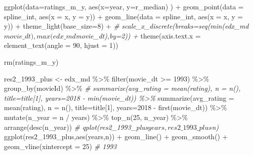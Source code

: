 \documentclass[
]{article}
\newenvironment{Shaded}{}{}
\newcommand{\AttributeTok}[1]{\textcolor[rgb]{0.49,0.56,0.16}{#1}}
\newcommand{\CommentTok}[1]{\textcolor[rgb]{0.38,0.63,0.69}{\textit{#1}}}
\newcommand{\DecValTok}[1]{\textcolor[rgb]{0.25,0.63,0.44}{#1}}
\newcommand{\FunctionTok}[1]{\textcolor[rgb]{0.02,0.16,0.49}{#1}}
\newcommand{\NormalTok}[1]{#1}
\newcommand{\OtherTok}[1]{\textcolor[rgb]{0.00,0.44,0.13}{#1}}
\newcommand{\SpecialCharTok}[1]{\textcolor[rgb]{0.25,0.44,0.63}{#1}}
\begin{document}
\begin{Shaded}
\begin{Highlighting}[]
\FunctionTok{ggplot}\NormalTok{(}\AttributeTok{data=}\NormalTok{ratings\_m\_y, }\FunctionTok{aes}\NormalTok{(}\AttributeTok{x=}\NormalTok{year, }\AttributeTok{y=}\NormalTok{r\_median) ) }\SpecialCharTok{+}
  \FunctionTok{geom\_point}\NormalTok{(}\AttributeTok{data =}\NormalTok{ spline\_int, }\FunctionTok{aes}\NormalTok{(}\AttributeTok{x =}\NormalTok{ x, }\AttributeTok{y =}\NormalTok{ y)) }\SpecialCharTok{+}
  \FunctionTok{geom\_line}\NormalTok{(}\AttributeTok{data =}\NormalTok{ spline\_int, }\FunctionTok{aes}\NormalTok{(}\AttributeTok{x =}\NormalTok{ x, }\AttributeTok{y =}\NormalTok{ y)) }\SpecialCharTok{+}
  \FunctionTok{theme\_light}\NormalTok{(}\AttributeTok{base\_size=}\DecValTok{8}\NormalTok{) }\SpecialCharTok{+}
  \CommentTok{\# scale\_x\_discrete(breaks=seq(min(edx\_md$movie\_dt),max(edx\_md$movie\_dt),by=2)) +}
  \FunctionTok{theme}\NormalTok{(}\AttributeTok{axis.text.x =} \FunctionTok{element\_text}\NormalTok{(}\AttributeTok{angle =} \DecValTok{90}\NormalTok{, }\AttributeTok{hjust =} \DecValTok{1}\NormalTok{))}

\FunctionTok{rm}\NormalTok{(ratings\_m\_y)}

\NormalTok{res2\_1993\_plus }\OtherTok{\textless{}{-}}\NormalTok{ edx\_md }\SpecialCharTok{\%\textgreater{}\%}
  \FunctionTok{filter}\NormalTok{(movie\_dt }\SpecialCharTok{\textgreater{}=} \DecValTok{1993}\NormalTok{) }\SpecialCharTok{\%\textgreater{}\%}
  \FunctionTok{group\_by}\NormalTok{(movieId) }\SpecialCharTok{\%\textgreater{}\%}
  \CommentTok{\# summarize(avg\_rating = mean(rating), n = n(), title=title[1], years=2018 {-} min(movie\_dt)) \%\textgreater{}\% }
  \FunctionTok{summarize}\NormalTok{(}\AttributeTok{avg\_rating =} \FunctionTok{mean}\NormalTok{(rating), }\AttributeTok{n =} \FunctionTok{n}\NormalTok{(), }\AttributeTok{title=}\NormalTok{title[}\DecValTok{1}\NormalTok{], }\AttributeTok{years=}\DecValTok{2018} \SpecialCharTok{{-}} \FunctionTok{first}\NormalTok{(movie\_dt)) }\SpecialCharTok{\%\textgreater{}\%} 
  \FunctionTok{mutate}\NormalTok{(}\AttributeTok{n\_year =}\NormalTok{ n }\SpecialCharTok{/}\NormalTok{ years) }\SpecialCharTok{\%\textgreater{}\%}
  \FunctionTok{top\_n}\NormalTok{(}\DecValTok{25}\NormalTok{, n\_year) }\SpecialCharTok{\%\textgreater{}\%}
  \FunctionTok{arrange}\NormalTok{(}\FunctionTok{desc}\NormalTok{(n\_year))}
\CommentTok{\# qplot(res2\_1993\_plus$years,res2\_1993\_plus$n)}
\FunctionTok{ggplot}\NormalTok{(res2\_1993\_plus,}\FunctionTok{aes}\NormalTok{(years,n)) }\SpecialCharTok{+} 
  \FunctionTok{geom\_line}\NormalTok{() }\SpecialCharTok{+} 
  \FunctionTok{geom\_smooth}\NormalTok{() }\SpecialCharTok{+} 
  \FunctionTok{geom\_vline}\NormalTok{(}\AttributeTok{xintercept =} \DecValTok{25}\NormalTok{) }\CommentTok{\# 1993}


\end{Highlighting}
\end{Shaded}
\end{document}
